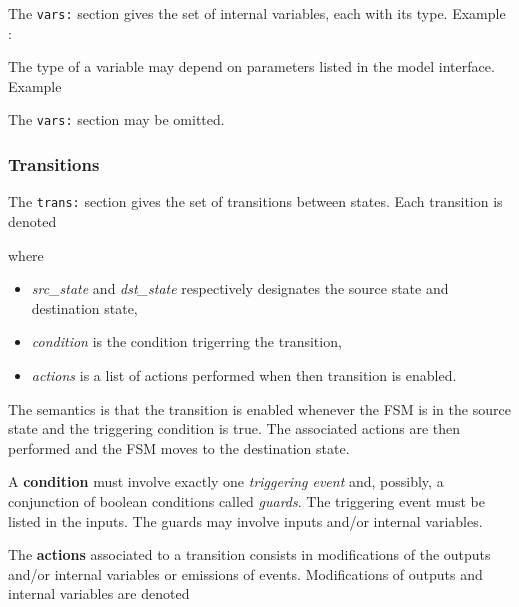 The \verb|vars:| section gives the set of internal variables, each with its type. Example :

\begin{center}
\end{center}

The type of a variable may depend on parameters listed in the model interface. Example

\begin{center}
\end{center}

The \verb|vars:| section may be omitted.

\subsubsection*{Transitions}
\label{sec:transitions}

The \verb|trans:| section gives the set of transitions between states. Each transition is denoted

\begin{center}
\end{center}

where
\begin{itemize}
\item \emph{src\_state} and \emph{dst\_state} respectively designates the source state and destination state,
\item \emph{condition} is the condition trigerring the transition,
\item \emph{actions} is a list of actions performed when then transition is enabled.
\end{itemize}

\medskip The semantics is that the transition is enabled whenever the FSM is in the source state and
the triggering condition is true. The associated actions are then performed and the FSM moves to the
destination state.

\medskip
A \textbf{condition} must involve exactly one \emph{triggering event} and, possibly, a conjunction of boolean
conditions called \emph{guards}. The triggering event must be listed in the inputs. The guards may
involve inputs and/or internal variables.

\medskip The \textbf{actions} associated to a transition consists in modifications of the outputs
and/or internal variables or emissions of events. Modifications of outputs and internal variables
are denoted

